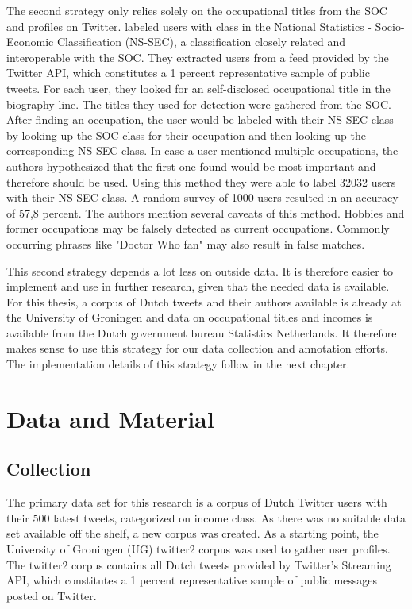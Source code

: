 \documentclass[
10pt, %
a4paper, %
oneside, %
headinclude,footinclude, %
] {book}%
\begin{document}
The second strategy only relies solely on the occupational titles from the SOC and profiles on Twitter. \citet{sloan} labeled users with class in the National Statistics - Socio-Economic Classification (NS-SEC), a classification closely related and interoperable with the SOC. 
They extracted users from a feed provided by the Twitter API, which constitutes a 1 percent representative sample of public tweets. For each user, they looked for an self-disclosed occupational title in the biography line. The titles they used for detection were gathered from the SOC. After finding an occupation, the user would be labeled with their NS-SEC class by looking up the SOC class for their occupation and then looking up the corresponding NS-SEC class. In case a user mentioned multiple occupations, the authors hypothesized that the first one found would be most important and therefore should be used. 
Using this method they were able to label 32032 users with their NS-SEC class. A random survey of 1000 users resulted in an accuracy of 57,8 percent. The authors mention several caveats of this method. Hobbies and former occupations may be falsely detected as current occupations. Commonly occurring phrases like "Doctor Who fan" may also result in false matches.

This second strategy depends a lot less on outside data. It is therefore easier to implement and use in further research, given that the needed data is available.  For this thesis, a corpus of Dutch tweets and their authors available is already at the University of Groningen and data on occupational titles and incomes is available from the Dutch government bureau Statistics Netherlands. It therefore makes sense to use this strategy for our data collection and annotation efforts. The implementation details of this strategy follow in the next chapter.


\chapter{Data and Material}
\section{Collection} 
The primary data set for this research is a corpus of Dutch Twitter users with their 500 latest tweets, categorized on income class. As there was no suitable data set available off the shelf, a new corpus was created. As a starting point, the University of Groningen (UG) twitter2 corpus was used to gather user profiles. The twitter2 corpus contains all Dutch tweets provided by Twitter's Streaming API, which constitutes a 1 percent representative sample of public messages posted on Twitter. 
\end{document}
